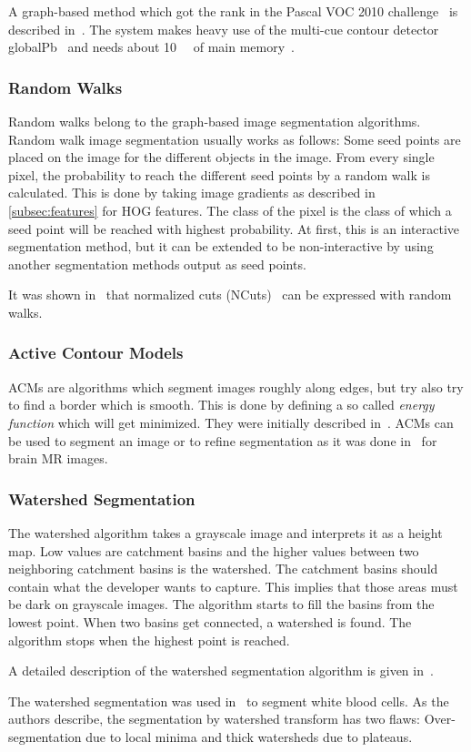 A graph-based method which got the  rank in the Pascal VOC 2010
challenge~\cite{everingham2010pascal} is described
in~\cite{carreira2010constrained}. The system makes heavy use of the multi-cue
contour detector globalPb~\cite{4587420} and needs about \SI{10}{\giga\byte}
of main memory~\cite{Carreira2011}.


\subsubsection{Random Walks}

Random walks belong to the graph-based image segmentation algorithms. Random
walk image segmentation usually works as follows: Some seed points are placed
on the image for the different objects in the image. From every single pixel,
the probability to reach the different seed points by a random walk is
calculated. This is done by taking image gradients as described in
\cref{subsec:features} for \gls{HOG} features. The class of the pixel is the
class of which a seed point will be reached with highest probability. At first,
this is an interactive segmentation method, but it can be extended to be
non-interactive by using another segmentation methods output as seed points.

It was shown in~\cite{meilpa2001learning} that normalized cuts
(NCuts)~\cite{shi2000normalized} can be expressed with random walks.


\subsubsection{Active Contour Models}

\Glspl{ACM} are algorithms which segment images roughly along edges, but try
also try to find a border which is smooth. This is done by defining a so called
\textit{energy function} which will get minimized. They were initially
described in~\cite{kass1988snakes}. \Glspl{ACM} can be used to segment an image
or to refine segmentation as it was done in~\cite{atkins1998fully} for brain
\gls{MR} images.


\subsubsection{Watershed Segmentation}\label{subsec:watershed}
The watershed algorithm takes a grayscale image and interprets it as a height
map. Low values are catchment basins and the higher values between two
neighboring catchment basins is the watershed. The catchment basins should
contain what the developer wants to capture. This implies that those areas
must be dark on grayscale images. The algorithm starts to fill the basins from
the lowest point. When two basins get connected, a watershed is found. The
algorithm stops when the highest point is reached.

A detailed description of the watershed segmentation algorithm is given
in~\cite{roerdink2000watershed}.

The watershed segmentation was used in~\cite{1260033} to segment white blood
cells. As the authors describe, the segmentation by watershed transform has
two flaws: Over-segmentation due to local minima and thick watersheds due to
plateaus.